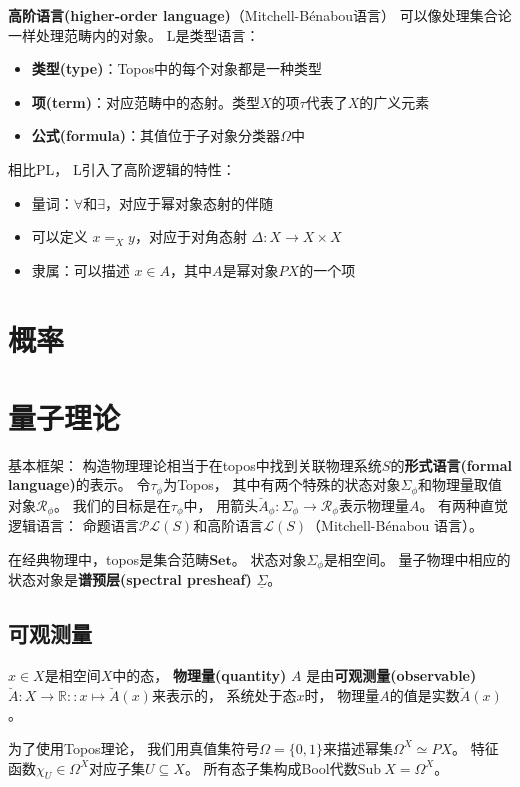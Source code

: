\documentclass[10pt, openany]{book}
\begin{document}
\textbf{高阶语言(higher-order language)}（Mitchell-Bénabou语言）
可以像处理集合论一样处理范畴内的对象。
L是类型语言：
\begin{itemize}
  \item \textbf{类型(type)}：Topos中的每个对象都是一种类型
  \item \textbf{项(term)}：对应范畴中的态射。类型$X$的项$\tau$代表了$X$的广义元素
  \item \textbf{公式(formula)}：其值位于子对象分类器$\Omega$中
\end{itemize}
相比PL，
L引入了高阶逻辑的特性：
\begin{itemize}
  \item 量词：$\forall$和$\exists$，对应于幂对象态射的伴随
  \item 可以定义 $x = _X y$，对应于对角态射 $\Delta: X \to X \times X$
  \item 隶属：可以描述 $x \in A$，其中$A$是幂对象$PX$的一个项
\end{itemize}

\chapter{概率}

\chapter{量子理论}

基本框架：
构造物理理论相当于在topos中找到关联物理系统$S$的\textbf{形式语言(formal language)}的表示。
令$\tau_\phi$为Topos，
其中有两个特殊的状态对象$\Sigma_\phi$和物理量取值对象$\mathcal R_\phi$。
我们的目标是在$\tau_\phi$中，
用箭头$\breve A_\phi : \Sigma_\phi \to \mathcal R_\phi$表示物理量$A$。
有两种直觉逻辑语言：
命题语言$\mathcal{PL}(S)$和高阶语言$\mathcal{L}(S)$（Mitchell-Bénabou 语言）。

在经典物理中，topos是集合范畴$\textbf{Set}$。
状态对象$\Sigma_\phi$是相空间。
量子物理中相应的状态对象是\textbf{谱预层(spectral presheaf)} $\underline{\Sigma}$。


\section{可观测量}

$x \in X$是相空间$X$中的态，
\textbf{物理量(quantity)} $A$ 是由\textbf{可观测量(observable)} 
$\breve A: X \to \mathbb R :: x \mapsto \breve A(x)$来表示的，
系统处于态$x$时，
物理量$A$的值是实数$\breve A(x)$。

为了使用Topos理论，
我们用真值集符号$\Omega = \{0,1\}$来描述幂集$\Omega^X \simeq PX$。
特征函数$\chi_U \in \Omega^X$对应子集$U \subseteq X$。
所有态子集构成Bool代数$\text{Sub} \ X = \Omega^X$。
\end{document}
